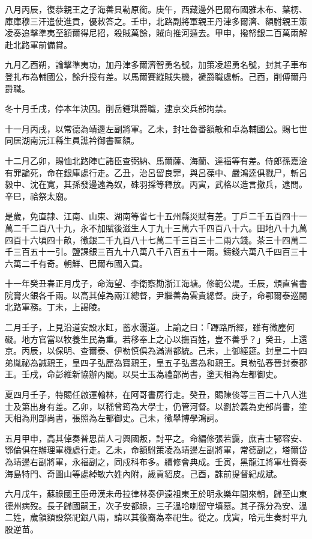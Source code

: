 \begin{pinyinscope}
八月丙辰，復恭親王之子海善貝勒原銜。庚午，西藏邊外巴爾布國雅木布、葉楞、庫庫穆三汗遣使進貢，優敕答之。壬申，北路副將軍親王丹津多爾濟、額駙親王策凌奏追擊準夷至額爾得尼招，殺賊萬餘，賊向推河遁去。甲申，撥帑銀二百萬兩解赴北路軍前備賞。

九月乙酉朔，論擊準夷功，加丹津多爾濟智勇名號，加策凌超勇名號，封其子車布登扎布為輔國公，餘升授有差。以馬爾賽縱賊失機，褫爵職處斬。己酉，削傅爾丹爵職。

冬十月壬戌，停本年決囚。削岳鍾琪爵職，逮京交兵部拘禁。

十一月丙戌，以常德為靖邊左副將軍。乙未，封吐魯番額敏和卓為輔國公。賜七世同居湖南沅江縣生員譙衿御書匾額。

十二月乙卯，賜恤北路陣亡諸臣查弼納、馬爾薩、海蘭、達福等有差。侍郎孫嘉淦有罪論死，命在銀庫處行走。乙丑，治呂留良罪，與呂葆中、嚴鴻逵俱戮尸，斬呂毅中、沈在寬，其孫發邊遠為奴，硃羽採等釋放。丙寅，武格以造言撤兵，逮問。辛巳，祫祭太廟。

是歲，免直隸、江南、山東、湖南等省七十五州縣災賦有差。丁戶二千五百四十一萬二千二百八十九，永不加賦後滋生人丁九十三萬六千四百八十六。田地八十九萬四百十六頃四十畝，徵銀二千九百八十七萬二千三百三十二兩六錢。茶三十四萬二千三百五十一引。鹽課銀三百九十八萬八千八百五十一兩。鑄錢六萬八千四百三十六萬二千有奇。朝鮮、巴爾布國入貢。

十一年癸丑春正月戊子，命海望、李衛察勘浙江海塘。修範公堤。壬辰，頒直省書院膏火銀各千兩。以高其倬為兩江總督，尹繼善為雲貴總督。庚子，命鄂爾泰巡閱北路軍務。丁未，上謁陵。

二月壬子，上見沿道安設水缸，蓄水灑道。上諭之曰：「蹕路所經，雖有微塵何礙。地方官當以牧養生民為重。若移奉上之心以撫百姓，豈不善乎？」癸丑，上還京。丙辰，以保明、查爾泰、伊勒慎俱為滿洲都統。己未，上御經筵。封皇二十四弟胤祕為諴親王，皇四子弘歷為寶親王，皇五子弘晝為和親王。貝勒弘春晉封泰郡王。壬戌，命彭維新協辦內閣。以吳士玉為禮部尚書，塗天相為左都御史。

夏四月壬子，特賜任啟運翰林，在阿哥書房行走。癸丑，賜陳倓等三百二十八人進士及第出身有差。乙卯，以嵇曾筠為大學士，仍管河督。以劉於義為吏部尚書，塗天相為刑部尚書，張照為左都御史。己未，徵舉博學鴻詞。

五月甲申，高其倬奏普思苗人刁興國叛，討平之。命編修張若靄，庶吉士鄂容安、鄂倫俱在辦理軍機處行走。乙未，命額駙策凌為靖邊左副將軍，常德副之，塔爾岱為靖邊右副將軍，永福副之，同戍科布多。續修會典成。壬寅，黑龍江將軍杜賚奏海島特門、奇圖山等處綽敏六姓內附，歲貢貂皮。己酉，誅前提督紀成斌。

六月戊午，蘇祿國王臣毋漢未毋拉律林奏伊遠祖東王於明永樂年間來朝，歸至山東德州病歿。長子歸國嗣王，次子安都祿，三子溫哈喇留守墳墓。其子孫分為安、溫二姓，歲領額設祭祀銀八兩，請以其後裔為奉祀生。從之。戊寅，哈元生奏討平九股逆苗。


\end{pinyinscope}

